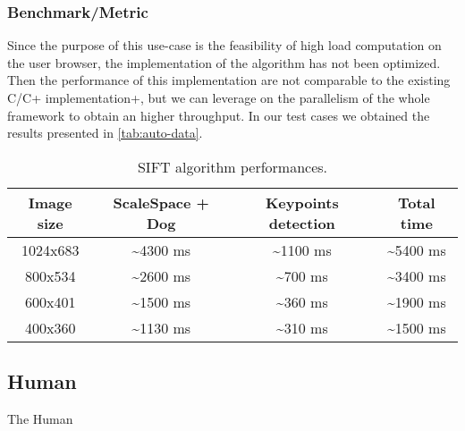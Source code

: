 \subsubsection{Benchmark/Metric}
Since the purpose of this use-case is the feasibility of high load computation
on the user browser, the implementation of the algorithm has not been optimized.
Then the performance of this implementation are not comparable to the existing
C/C+ implementation+, but we can leverage on the parallelism of the whole
framework to obtain an higher throughput. In our test cases we obtained the
results presented in \autoref{tab:auto-data}.
\begin{table}[htb]
    \caption{\acs{SIFT} algorithm performances.}
    \label{tab:auto-data}
    \centering
    \begin{tabular}{c|c|c|c}
        \textbf{Image size} & \textbf{ScaleSpace + Dog} & \textbf{Keypoints
        detection} & \textbf{Total time}\\
        \hline
        1024x683 & \textasciitilde{}4300 ms & \textasciitilde{}1100 ms & \textasciitilde{}5400 ms\\
        \hline
        800x534 & \textasciitilde{}2600 ms & \textasciitilde{}700 ms & \textasciitilde{}3400 ms\\
        \hline
        600x401 & \textasciitilde{}1500 ms & \textasciitilde{}360 ms & \textasciitilde{}1900 ms\\
        \hline
        400x360 & \textasciitilde{}1130 ms & \textasciitilde{}310 ms & \textasciitilde{}1500 ms\\
        \hline
    \end{tabular}
\end{table}

















\subsection{Human}
The Human





















